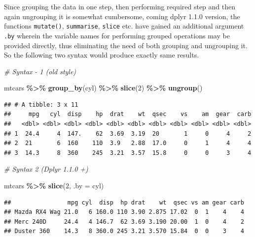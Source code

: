 \documentclass[
]{book}
\newenvironment{Shaded}{\begin{snugshade}}{\end{snugshade}}
\newcommand{\AttributeTok}[1]{\textcolor[rgb]{0.13,0.29,0.53}{#1}}
\newcommand{\CommentTok}[1]{\textcolor[rgb]{0.56,0.35,0.01}{\textit{#1}}}
\newcommand{\DecValTok}[1]{\textcolor[rgb]{0.00,0.00,0.81}{#1}}
\newcommand{\FunctionTok}[1]{\textcolor[rgb]{0.13,0.29,0.53}{\textbf{#1}}}
\newcommand{\NormalTok}[1]{#1}
\newcommand{\SpecialCharTok}[1]{\textcolor[rgb]{0.81,0.36,0.00}{\textbf{#1}}}
\begin{document}
Since grouping the data in one step, then performing required step and then again ungrouping it is somewhat cumbersome, coming dplyr 1.1.0 version, the functions \texttt{mutate()}, \texttt{summarise}, \texttt{slice} etc. have gained an additional argument \texttt{.by} wherein the variable names for performing grouped operations may be provided directly, thus eliminating the need of both grouping and ungrouping it. So the following two syntax would produce exactly same results.

\begin{Shaded}
\begin{Highlighting}[]
\CommentTok{\# Syntax {-} 1 (old style)}

\NormalTok{mtcars }\SpecialCharTok{\%\textgreater{}\%} 
  \FunctionTok{group\_by}\NormalTok{(cyl) }\SpecialCharTok{\%\textgreater{}\%} 
  \FunctionTok{slice}\NormalTok{(}\DecValTok{2}\NormalTok{) }\SpecialCharTok{\%\textgreater{}\%} 
  \FunctionTok{ungroup}\NormalTok{()}
\end{Highlighting}
\end{Shaded}

\begin{verbatim}
## # A tibble: 3 x 11
##     mpg   cyl  disp    hp  drat    wt  qsec    vs    am  gear  carb
##   <dbl> <dbl> <dbl> <dbl> <dbl> <dbl> <dbl> <dbl> <dbl> <dbl> <dbl>
## 1  24.4     4  147.    62  3.69  3.19  20       1     0     4     2
## 2  21       6  160    110  3.9   2.88  17.0     0     1     4     4
## 3  14.3     8  360    245  3.21  3.57  15.8     0     0     3     4
\end{verbatim}

\begin{Shaded}
\begin{Highlighting}[]
\CommentTok{\# Syntax 2 (Dplyr 1.1.0 +)}

\NormalTok{mtcars }\SpecialCharTok{\%\textgreater{}\%} 
  \FunctionTok{slice}\NormalTok{(}\DecValTok{2}\NormalTok{, }\AttributeTok{.by =}\NormalTok{ cyl)}
\end{Highlighting}
\end{Shaded}

\begin{verbatim}
##                mpg cyl  disp  hp drat    wt  qsec vs am gear carb
## Mazda RX4 Wag 21.0   6 160.0 110 3.90 2.875 17.02  0  1    4    4
## Merc 240D     24.4   4 146.7  62 3.69 3.190 20.00  1  0    4    2
## Duster 360    14.3   8 360.0 245 3.21 3.570 15.84  0  0    3    4
\end{verbatim}
\end{document}
